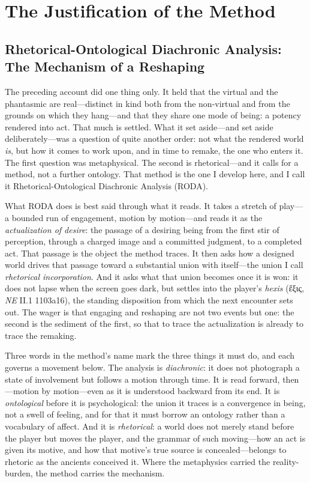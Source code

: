 \documentclass{article}
\newcommand{\gk}[1]{{\greekfont #1}}
\begin{document}
\section{The Justification of the Method}

\subsection{Rhetorical-Ontological Diachronic Analysis: The Mechanism of a Reshaping}

The preceding account did one thing only. It held that the virtual and the phantasmic are real---distinct in kind both from the non-virtual and from the grounds on which they hang---and that they share one mode of being: a potency rendered into act. That much is settled. What it set aside---and set aside deliberately---was a question of quite another order: not what the rendered world \textit{is}, but how it comes to work upon, and in time to remake, the one who enters it. The first question was metaphysical. The second is rhetorical---and it calls for a method, not a further ontology. That method is the one I develop here, and I call it Rhetorical-Ontological Diachronic Analysis (RODA).

What RODA does is best said through what it reads. It takes a stretch of play---a bounded run of engagement, motion by motion---and reads it as the \textit{actualization of desire}: the passage of a desiring being from the first stir of perception, through a charged image and a committed judgment, to a completed act. That passage is the object the method traces. It then asks how a designed world drives that passage toward a substantial union with itself---the union I call \textit{rhetorical incorporation}. And it asks what that union becomes once it is won: it does not lapse when the screen goes dark, but settles into the player's \textit{hexis} (\gk{ἕξις}, \textit{NE} II.1 1103a16), the standing disposition from which the next encounter sets out. The wager is that engaging and reshaping are not two events but one: the second is the sediment of the first, so that to trace the actualization is already to trace the remaking.

Three words in the method's name mark the three things it must do, and each governs a movement below. The analysis is \textit{diachronic}: it does not photograph a state of involvement but follows a motion through time. It is read forward, then---motion by motion---even as it is understood backward from its end. It is \textit{ontological} before it is psychological: the union it traces is a convergence in being, not a swell of feeling, and for that it must borrow an ontology rather than a vocabulary of affect. And it is \textit{rhetorical}: a world does not merely stand before the player but moves the player, and the grammar of such moving---how an act is given its motive, and how that motive's true source is concealed---belongs to rhetoric as the ancients conceived it. Where the metaphysics carried the reality-burden, the method carries the mechanism.
\end{document}
